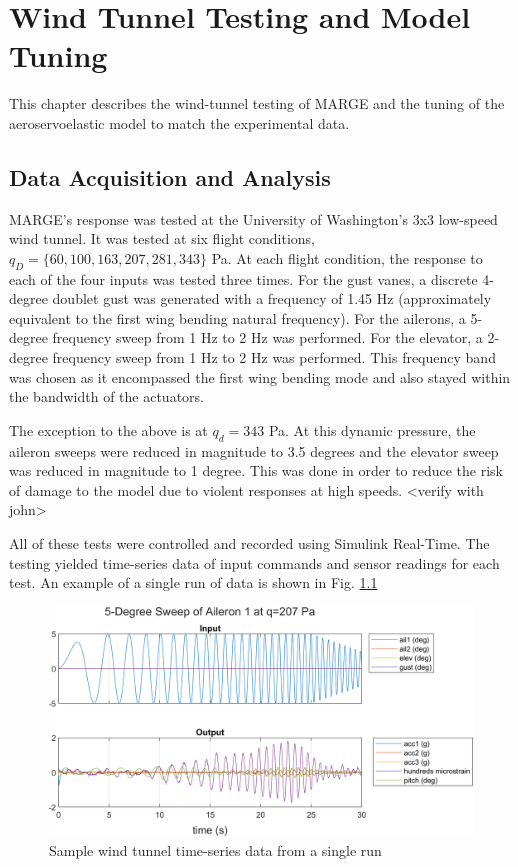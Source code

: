 \chapter{Wind Tunnel Testing and Model Tuning}
\label{ch:windTunnel}

This chapter describes the wind-tunnel testing of MARGE and the tuning of the aeroservoelastic model to match the experimental data.

\section{Data Acquisition and Analysis} %
\label{sec:wtDAQ}

MARGE's response was tested at the University of Washington's 3x3 low-speed wind tunnel. It was tested at six flight conditions, $q_D=\{60,100,163,207,281,343\}$ Pa. At each flight condition, the response to each of the four inputs was tested three times. For the gust vanes, a discrete 4-degree doublet gust was generated with a frequency of 1.45 Hz (approximately equivalent to the first wing bending natural frequency). For the ailerons, a 5-degree frequency sweep from 1 Hz to 2 Hz was performed. For the elevator, a 2-degree frequency sweep from 1 Hz to 2 Hz was performed. This frequency band was chosen as it encompassed the first wing bending mode and also stayed within the bandwidth of the actuators.

The exception to the above is at $q_d=343$ Pa. At this dynamic pressure, the aileron sweeps were reduced in magnitude to 3.5 degrees and the elevator sweep was reduced in magnitude to 1 degree. This was done in order to reduce the risk of damage to the model due to violent responses at high speeds. <verify with john>

All of these tests were controlled and recorded using Simulink Real-Time. The testing yielded time-series data of input commands and sensor readings for each test. An example of a single run of data is shown in Fig. \ref{fig:sampleWT}
\begin{figure}[H]
	\centering
	\label{fig:sampleWT}
	\includegraphics[width=6in]{figs/sampleWT.png}
	\caption{Sample wind tunnel time-series data from a single run}
\end{figure}

